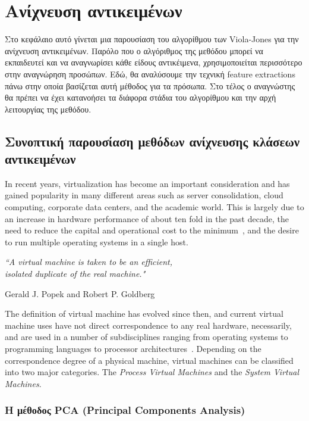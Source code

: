 \chapter{Ανίχνευση αντικειμένων}\label{ch:facedetection}

Στο κεφάλαιο αυτό γίνεται μια παρουσίαση του αλγορίθμου των Viola-Jones για την
ανίχνευση αντικειμένων. Παρόλο που ο αλγόριθμος της μεθόδου μπορεί να εκπαιδευτεί
και να αναγνωρίσει κάθε είδους αντικέιμενα, χρησιμοποιείται περισσότερο στην
αναγνώρηση προσώπων. Εδώ, θα αναλύσουμε την τεχνική feature extractions πάνω στην
οποία βασίζεται αυτή μέθοδος για τα πρόσωπα. Στο τέλος ο αναγνώστης θα πρέπει
να έχει κατανοήσει τα διάφορα στάδια του αλγορίθμου και την αρχή λειτουργίας
της μεθόδου.

\section{Συνοπτική παρουσίαση μεθόδων ανίχνευσης κλάσεων αντικειμένων}\label{sec:facedetmethods}

In recent years, virtualization has become an important consideration and has
gained popularity in many different areas such as server consolidation, cloud
computing, corporate data centers, and the academic world. This is largely due
to an increase in hardware performance of about ten fold in the past decade, the
need to reduce the capital and operational cost to the minimum~\cite{Graziano},
and the desire to run multiple operating systems in a single host.

\begin{flushright}
  \emph{``A virtual machine is taken to be an efficient,\\
        isolated duplicate of the real
        machine."}~\cite{DBLP:journals/cacm/PopekG74}


  Gerald J. Popek and Robert P. Goldberg
\end{flushright}
The definition of virtual machine has evolved since then, and current virtual
machine uses have not direct correspondence to any real hardware, necessarily,
and are used in a number of subdisciplines ranging from operating systems to
programming languages to processor architectures~\cite{smith_nair}. Depending on
the correspondence degree of a physical machine, virtual machines can be
classified into two major categories. The \emph{Process Virtual Machines} and
the \emph{System Virtual Machines}.


\subsection{Η μέθοδος PCA (Principal Components Analysis)}


